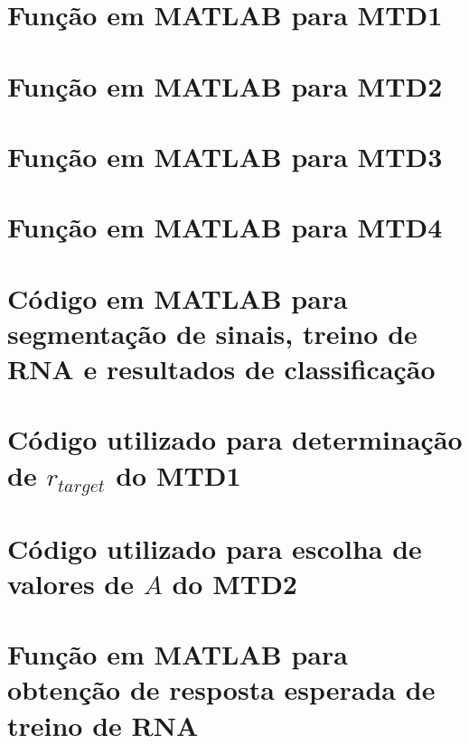 	\begin{apendicesenv}
	\partapendices
\chapter{Função em MATLAB para MTD1}

\label{ap:seg_mtd1}
\chapter{Função em MATLAB para MTD2}

\label{ap:seg_mtd2}
\chapter{Função em MATLAB para MTD3}

\label{ap:seg_mtd3}
\chapter{Função em MATLAB para MTD4}

\label{ap:seg_mtd4}
\chapter{Código em MATLAB para segmentação de sinais, treino de RNA e resultados de classificação}

\label{ap:complete_mtd1}
\chapter{Código utilizado para determinação de $r_{target}$ do MTD1}
\label{ap:r_target}

\chapter{Código utilizado para escolha de valores de $A$ do MTD2}
\label{ap:Avalue}

\chapter{Função em MATLAB para obtenção de resposta esperada de treino de RNA}
\label{ap:idMoves}

\end{apendicesenv}

